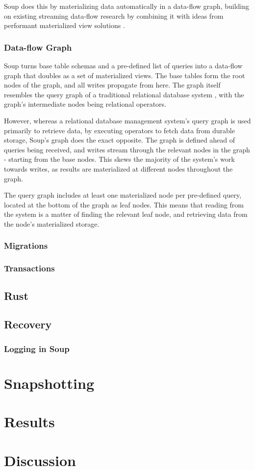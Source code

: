 \documentclass{report}
\begin{document}
Soup does this by materializing data automatically in a data-flow
graph, building on existing streaming data-flow research \cite{naiad, dataflow}
by combining it with ideas from performant materialized view solutions
\cite{dbtoaster, pequod}.

\subsection{Data-flow Graph}
Soup turns base table schemas and a pre-defined list of queries into a data-flow
graph that doubles as a set of materialized views. The base tables form the
root nodes of the graph, and all writes propagate from here. The graph itself
resembles the query graph of a traditional relational database system
\cite{codd}, with the graph's intermediate nodes being relational operators.

However, whereas a relational database management system's query graph is used
primarily to retrieve data, by executing operators to fetch data from durable
storage, Soup's graph does the exact opposite. The graph is defined ahead of
queries being received, and writes stream through the relevant nodes in the
graph - starting from the base nodes. This skews the majority of the system's
work towards writes, as results are materialized at different nodes throughout
the graph.

The query graph includes at least one materialized node per pre-defined query,
located at the bottom of the graph as leaf nodes. This means that reading from
the system is a matter of finding the relevant leaf node, and retrieving data
from the node's materialized storage.


\subsection{Migrations}

\subsection{Transactions}

\section{Rust}

\section{Recovery}
\subsection{Logging in Soup}

\chapter{Snapshotting}
\chapter{Results}
\chapter{Discussion}



\end{document}
